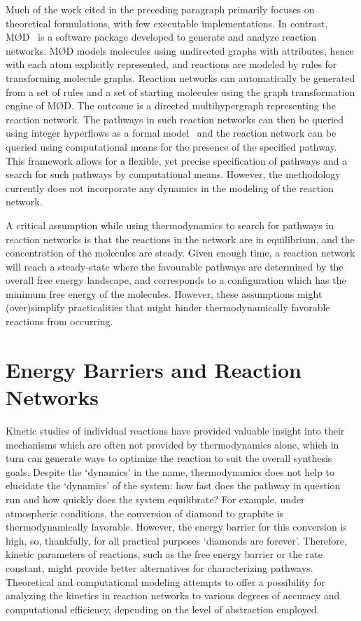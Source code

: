Much of the work cited in the preceding paragraph primarily focuses on theoretical formulations, with few executable implementations.
In contrast, MØD~\cite{mod_web,jakob_software} is a software package developed to generate and analyze reaction networks.
M{\O}D models molecules using undirected graphs with attributes, hence with each atom explicitly represented, and reactions are modeled by rules for transforming molecule graphs.
Reaction networks can automatically be generated from a set of rules and a set of starting molecules using the graph transformation engine of M{\O}D.
The outcome is a directed multihypergraph representing the reaction network.
The pathways in such reaction networks can then be queried using integer hyperflows as a formal model~\cite{jakob_integer_hyperflows}
and the reaction network can be queried using computational means for the presence of the specified pathway.
This framework allows for a flexible, yet precise specification of pathways and a search for such pathways by computational means.
However, the methodology~\cite{jakob_integer_hyperflows} currently does not incorporate any dynamics in the modeling of the reaction network.

A critical assumption while using thermodynamics to search for pathways in reaction networks is that the reactions in the network are in equilibrium, and the concentration of the molecules are steady. Given enough time, a reaction network will reach a steady-state where the favourable pathways are determined by the overall free energy landscape, and corresponds to a configuration which has the minimum free energy of the molecules. However, these assumptions might (over)simplify practicalities that might hinder thermodynamically favorable reactions from occurring.

\section{Energy Barriers and Reaction Networks}

Kinetic studies of individual reactions have provided valuable insight into their mechanisms which are often not provided by thermodynamics alone, which in turn can generate ways to optimize the reaction to suit the overall synthesis goals.
Despite the `dynamics' in the name, thermodynamics does not help to elucidate the `dynamics' of the system: how fast does the pathway in question run and how quickly does the system equilibrate? For example, under atmospheric conditions, the conversion of diamond to graphite is thermodynamically favorable. However, the energy barrier for this conversion is high, so, thankfully, for all practical purposes `diamonds are forever'. 
Therefore, kinetic parameters of reactions, such as the free energy barrier or the rate constant, might provide better alternatives for characterizing pathways. Theoretical and computational modeling attempts to offer a possibility for analyzing the kinetics in reaction networks to various degrees of accuracy and computational efficiency, depending on the level of abstraction employed.

